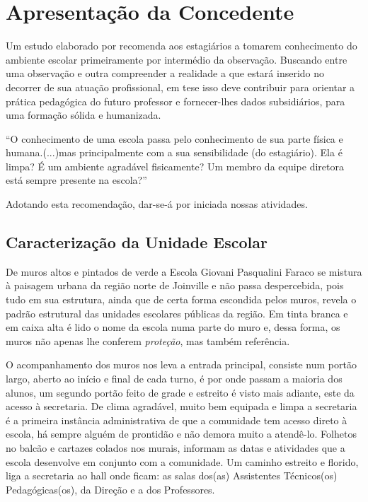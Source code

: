 \chapter{Apresentação da Concedente}
\thispagestyle{empty}
\label{cap: aprConcedente}

Um estudo elaborado por \cite{CARVALHO:2012} recomenda aos estagiários a tomarem conhecimento do ambiente escolar primeiramente por intermédio da observação. Buscando entre uma observação e outra compreender a realidade a que estará inserido no decorrer de sua atuação profissional, em tese isso deve contribuir para orientar a prática pedagógica do futuro professor e fornecer-lhes dados subsidiários, para uma formação sólida e humanizada.

\begin{citacao}
``O conhecimento de uma escola passa pelo conhecimento de sua parte física e humana.(...)mas principalmente com a sua sensibilidade (do estagiário). Ela é limpa? É um ambiente agradável fisicamente? Um membro da equipe diretora está sempre presente na escola?'' 
\end{citacao}
Adotando esta recomendação, dar-se-á por iniciada nossas atividades.

\section{Caracterização da Unidade Escolar}
De muros altos e pintados de verde a Escola Giovani Pasqualini Faraco se mistura à paisagem urbana da região norte de Joinville e não passa despercebida, pois tudo em sua estrutura, ainda que de certa forma escondida pelos muros, revela o padrão estrutural das unidades escolares públicas da região. Em tinta branca e em caixa alta é lido o nome da escola numa parte do muro e, dessa forma, os muros não apenas lhe conferem \emph{proteção}, mas também referência.

O acompanhamento dos muros nos leva a entrada principal, consiste num portão largo, aberto ao início e final de cada turno, é por onde passam a maioria dos alunos, um segundo portão feito de grade e estreito é visto mais adiante, este da acesso à secretaria. De clima agradável, muito bem equipada e limpa a secretaria é a primeira instância administrativa de que a comunidade tem acesso direto à escola, há sempre alguém de prontidão e não demora muito a atendê-lo. Folhetos no balcão e cartazes colados nos murais, informam as datas e atividades que a escola desenvolve em conjunto com a comunidade. Um caminho estreito e florido, liga a secretaria ao hall onde ficam: as salas dos(as) Assistentes Técnicos(os) Pedagógicas(os), da Direção e a dos Professores.

